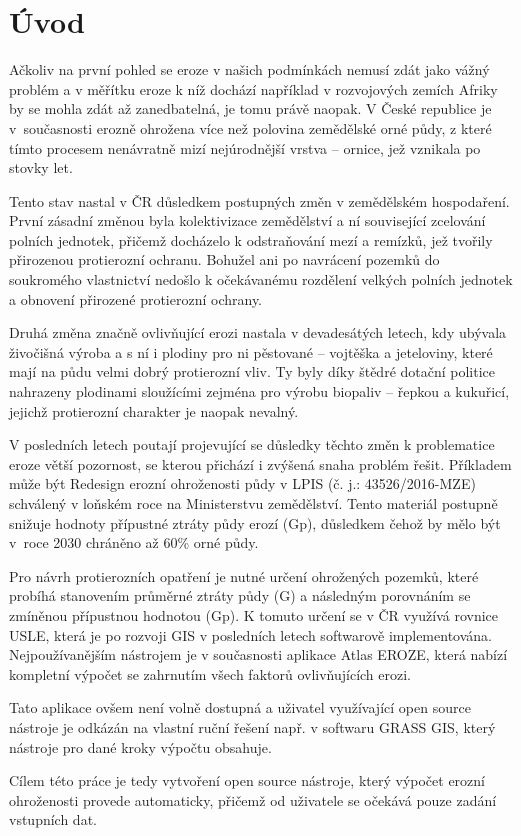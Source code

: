 \chapter{Úvod}

Ačkoliv na první pohled se eroze v našich podmínkách nemusí zdát jako
vážný problém a v měřítku eroze k níž dochází například v rozvojových
zemích Afriky by se mohla zdát až zanedbatelná, je tomu právě
naopak. V České republice je v~současnosti erozně ohrožena více než
polovina zemědělské orné půdy, z které tímto procesem nenávratně mizí
nejúrodnější vrstva – ornice, jež vznikala po stovky let.

Tento stav nastal v ČR důsledkem postupných změn v zemědělském
hospodaření. První zásadní změnou byla kolektivizace zemědělství a ní
související zcelování polních jednotek, přičemž docházelo k
odstraňování mezí a remízků, jež tvořily přiroze\-nou protierozní
ochranu. Bohužel ani po navrácení pozemků do soukromého vlastnictví
nedošlo k očekávanému rozdělení velkých polních jednotek a obnovení
přirozené protierozní ochrany.

Druhá změna značně ovlivňující erozi nastala v devadesátých letech,
kdy ubývala živočišná výroba a s ní i plodiny pro ni pěstované –
vojtěška a jeteloviny, které mají na půdu velmi dobrý protierozní
vliv. Ty byly díky štědré dotační politice nahrazeny plodinami
sloužícími zejména pro výrobu biopaliv – řepkou a kukuřicí, jejichž
protierozní charakter je naopak nevalný.

V posledních letech poutají projevující se důsledky těchto změn k
problematice eroze větší pozornost, se kterou přichází i zvýšená snaha
problém řešit. Příkladem může být Redesign erozní ohroženosti půdy v
LPIS (č. j.: 43526/2016-MZE) schválený v loňském roce na Ministerstvu
zemědělství. Tento materiál postupně snižuje hodnoty přípustné ztráty
půdy erozí (Gp), důsledkem čehož by mělo být v~roce 2030 chráněno až
60\% orné půdy.

Pro návrh protierozních opatření je nutné určení ohrožených pozemků,
které probíhá stanovením průměrné ztráty půdy (G) a následným
porovnáním se zmíněnou přípustnou hodnotou (Gp). K tomuto určení se v
ČR využívá rovnice USLE, která je po rozvoji GIS v posledních letech
softwarově implementována. Nejpoužívanějším nástrojem je v současnosti
aplikace Atlas EROZE, která nabízí kompletní výpočet se zahrnutím
všech faktorů ovlivňujících erozi.

Tato aplikace ovšem není volně dostupná a uživatel využívající open
source nástroje je odkázán na vlastní ruční řešení např. v softwaru
GRASS GIS, který nástroje pro dané kroky výpočtu obsahuje.

Cílem této práce je tedy vytvoření open source nástroje, který výpočet
erozní ohroženosti provede automaticky, přičemž od uživatele se
očekává pouze zadání vstupních dat.
